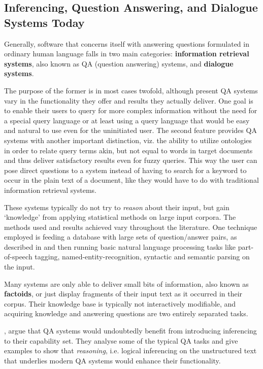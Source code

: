 \documentclass[a4paper]{article}
\newcommand{\abbr}{\textsf} %
\newcommand{\term}[1]{\textsf{\textbf{#1}}} %
\theoremstyle{remark}
\theoremstyle{remark}
\theoremstyle{definition}
\theoremstyle{definition}
\begin{document}
\subsection{Inferencing, Question Answering, and Dialogue Systems Today}\label{sec:comparison}

Generally, software that concerns itself with answering questions formulated in
ordinary human language falls in two main categories: \term{information
retrieval systems}, also known as \abbr{QA} (question answering) systems, and
\term{dialogue systems}.

The purpose of the former is in most cases twofold, although present \abbr{QA}
systems vary in the functionality they offer and results they actually deliver.
One goal is to enable their users to query for more complex information without
the need for a special query language or at least using a query language that
would be easy and natural to use even for the uninitiated user. The second
feature provides \abbr{QA} systems with another important distinction, viz. the
ability to utilize ontologies in order to relate query terms akin, but not equal
to words in target documents and thus deliver satisfactory results even for
fuzzy queries. This way the user can pose direct questions to a system instead
of having to search for a keyword to occur in the plain text of a document, like
they would have to do with traditional information retrieval systems. 

These systems typically do not try to \emph{reason} about
their input, but gain `knowledge' from applying statistical methods on large
input corpora. The methods used and results achieved vary throughout the
literature. One technique employed is feeding a database with large sets of
question/answer pairs, as described in \cite{rama} and then running basic
natural language processing tasks like part-of-speech tagging,
named-entity-recognition, syntactic and semantic parsing on the input.

Many systems are only able to deliver small bits of information, also known as
\term{factoids}, or just display fragments of their input text as it occurred in
their corpus. Their knowledge base is typically not interactively modifiable,
and acquiring knowledge and answering questions are two entirely separated
tasks.

\cite{webber}, argue that \abbr{QA} systems would undoubtedly benefit from
introducing inferencing to their capability set. They analyse some of the
typical \abbr{QA} tasks and give examples to show that \emph{reasoning},
i.e. logical inferencing on the unstructured text that underlies modern
\abbr{QA} systems would enhance their functionality.
\end{document}
